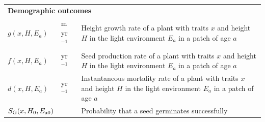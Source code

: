 \documentclass[10pt,twoside]{article}
\begin{document}
\begin{table}[h!]
\begin{tabular}{p{2cm}p{2.5cm}p{8cm}}
\multicolumn{3}{l}{\textbf{Demographic outcomes}} \\
$g(x, H, E_{a})$ & m yr$^{-1}$ & Height growth rate of a plant with traits $x$ and height $H$ in the light environment $E_a$ in a patch of age $a$ \\
$f(x, H, E_{a})$ & yr$^{-1}$ & Seed production rate of a plant with traits $x$ and height $H$ in the light environment $E_a$ in a patch of age $a$\\
$d(x, H, E_{a})$ & yr$^{-1}$ & Instantaneous mortality rate of a plant with traits $x$ and height $H$ in the light environment $E_a$ in a patch of age $a$\\
$S_{\rm G} (x, H_0, E_{{\rm a}0})$ & & Probability that a seed germinates successfully \\
\hline
\end{tabular}
\label{tab:definitions}
\end{table}

\newpage
\end{document}
